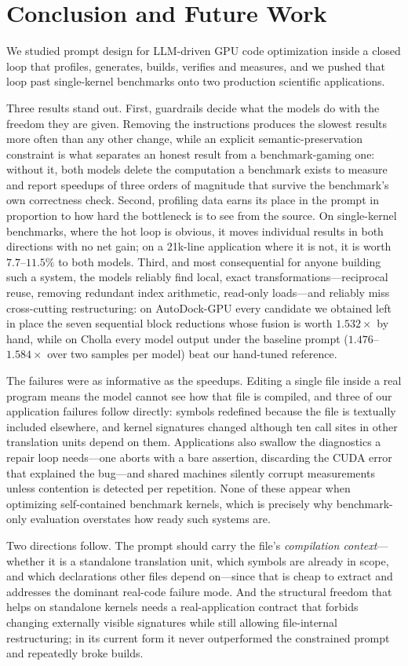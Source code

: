 \section{Conclusion and Future Work}
\label{sec:conclusions}
We studied prompt design for LLM-driven GPU code optimization inside a closed loop that profiles,
generates, builds, verifies and measures, and we pushed that loop past single-kernel benchmarks onto
two production scientific applications.

Three results stand out. First, guardrails decide what the models do with the freedom they are given.
Removing the instructions produces the slowest results more often than any other change, while an explicit semantic-preservation constraint is
what separates an honest result from a benchmark-gaming one: without it, both models delete the
computation a benchmark exists to measure and report speedups of three orders of magnitude that survive
the benchmark's own correctness check. Second, profiling data earns its place in the prompt in
proportion to how hard the bottleneck is to see from the source. On single-kernel benchmarks, where the
hot loop is obvious, it moves individual results in both directions with no net gain; on a 21k-line
application where it is not, it is worth $7.7$--$11.5\%$ to both models.
Third, and most consequential for anyone building such a system, the models reliably
find local, exact transformations---reciprocal reuse, removing redundant index arithmetic, read-only
loads---and reliably miss cross-cutting restructuring: on AutoDock-GPU every candidate we obtained left in
place the seven sequential block reductions whose fusion is worth $1.532\times$ by hand, while on Cholla every model output under the baseline prompt ($1.476$--$1.584\times$ over two samples
per model) beat our hand-tuned reference.

The failures were as informative as the speedups. Editing a single file inside a real program means the
model cannot see how that file is compiled, and three of our application failures follow directly:
symbols redefined because the file is textually included elsewhere, and kernel signatures changed
although ten call sites in other translation units depend on them. Applications also swallow the
diagnostics a repair loop needs---one aborts with a bare assertion, discarding the CUDA error that
explained the bug---and shared machines silently corrupt measurements unless contention is detected per
repetition. None of these appear when optimizing self-contained benchmark kernels, which is precisely
why benchmark-only evaluation overstates how ready such systems are.

Two directions follow. The prompt should carry the file's \emph{compilation context}---whether it is a
standalone translation unit, which symbols are already in scope, and which declarations other files
depend on---since that is cheap to extract and addresses the dominant real-code failure mode. And the
structural freedom that helps on standalone kernels needs a real-application contract that forbids
changing externally visible signatures while still allowing file-internal restructuring; in its current
form it never outperformed the constrained prompt and repeatedly broke builds.
